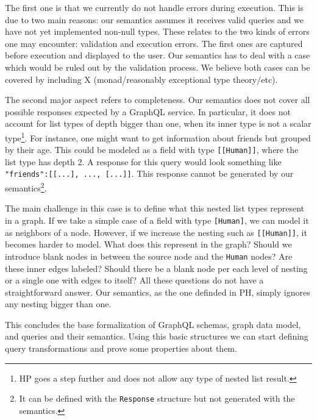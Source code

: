 The first one is that we currently do not handle errors during execution. This is due to two main reasons: our semantics assumes it receives valid queries and we have not yet implemented non-null types. These relates to the two kinds of errors one may encounter: validation and execution errors. The first ones are captured before execution and displayed to the user. Our semantics has to deal with a case which would be ruled out by the validation process. We believe both cases can be covered by including X (monad/reasonably exceptional type theory/etc).

The second major aspect refers to completeness. Our semantics does not cover all possible responses expected by a GraphQL service. In particular, it does not account for list types of depth bigger than one, when its inner type is not a scalar type\footnote{HP goes a step further and does not allow any type of nested list result.}. For instance, one might want to get information about friends but grouped by their age. This could be modeled as a field with type \texttt{[[Human]]}, where the list type has depth 2. A response for this query would look something like \texttt{"friends":[[...], ..., [...]]}. This response cannot be generated by our semantics\footnote{It can be defined with the \texttt{Response} structure but not generated with the semantics.}.

The main challenge in this case is to define what this nested list types represent in a graph. If we take a simple case of a field with type \texttt{[Human]}, we can model it as neighbors of a node. However, if we increase the nesting such as \texttt{[[Human]]}, it becomes harder to model. What does this represent in the graph? Should we introduce blank nodes in between the source node and the \texttt{Human} nodes? Are these inner edges labeled? Should there be a blank node per each level of nesting or a single one with edges to itself? All these questions do not have a straightforward answer. Our semantics, as the one definded in PH, simply ignores any nesting bigger than one.

This concludes the base formalization of GraphQL schemas, graph data model, and queries and their semantics. Using this basic structures we can start defining query transformations and prove some properties about them.
